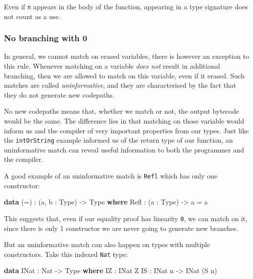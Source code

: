 \documentclass[
]{article}
\newenvironment{Shaded}{}{}
\newcommand{\DataTypeTok}[1]{\textcolor[rgb]{0.56,0.13,0.00}{#1}}
\newcommand{\KeywordTok}[1]{\textcolor[rgb]{0.00,0.44,0.13}{\textbf{#1}}}
\newcommand{\NormalTok}[1]{#1}
\newcommand{\OperatorTok}[1]{\textcolor[rgb]{0.40,0.40,0.40}{#1}}
\newcommand{\OtherTok}[1]{\textcolor[rgb]{0.00,0.44,0.13}{#1}}
\begin{document}
Even if \texttt{n} appears in the body of the function, appearing in a
type signature does not count as a use.

\hypertarget{no-branching-with-0}{%
\subsubsection{No branching with 0}\label{no-branching-with-0}}

In general, we cannot match on erased variables, there is however an
exception to this rule. Whenever matching on a variable \emph{does not}
result in additional branching, then we are allowed to match on this
variable, even if it erased. Such matches are called
\emph{uninformative}, and they are characterised by the fact that they
do not generate new codepaths.

No new codepaths means that, whether we match or not, the output
bytecode would be the same. The difference lies in that matching on
those variable would inform us and the compiler of very important
properties from our types. Just like the \texttt{intOrString} example
informed us of the return type of our function, an uninformative match
can reveal useful information to both the programmer and the compiler.

A good example of an uninformative match is \texttt{Refl} which has only
one constructor:

\begin{Shaded}
\begin{Highlighting}[]
\KeywordTok{data}\NormalTok{ (}\OtherTok{=}\NormalTok{) }\OperatorTok{:}\NormalTok{ (a, b }\OperatorTok{:} \DataTypeTok{Type}\NormalTok{) }\OtherTok{{-}\textgreater{}} \DataTypeTok{Type} \KeywordTok{where}
  \DataTypeTok{Refl} \OperatorTok{:}\NormalTok{ (a }\OperatorTok{:} \DataTypeTok{Type}\NormalTok{) }\OtherTok{{-}\textgreater{}}\NormalTok{ a }\OtherTok{=}\NormalTok{ a}
\end{Highlighting}
\end{Shaded}

This suggests that, even if our equality proof has linearity \texttt{0},
we can match on it, since there is only 1 constructor we are never going
to generate new branches.

But an uninformative match can also happen on types with multiple
constructors. Take this indexed \texttt{Nat} type:

\begin{Shaded}
\begin{Highlighting}[]
\KeywordTok{data} \DataTypeTok{INat} \OperatorTok{:} \DataTypeTok{Nat} \OtherTok{{-}\textgreater{}} \DataTypeTok{Type} \KeywordTok{where}
  \DataTypeTok{IZ} \OperatorTok{:} \DataTypeTok{INat} \DataTypeTok{Z}
  \DataTypeTok{IS} \OperatorTok{:} \DataTypeTok{INat}\NormalTok{ n }\OtherTok{{-}\textgreater{}} \DataTypeTok{INat}\NormalTok{ (}\DataTypeTok{S}\NormalTok{ n)}
\end{Highlighting}
\end{Shaded}
\end{document}

